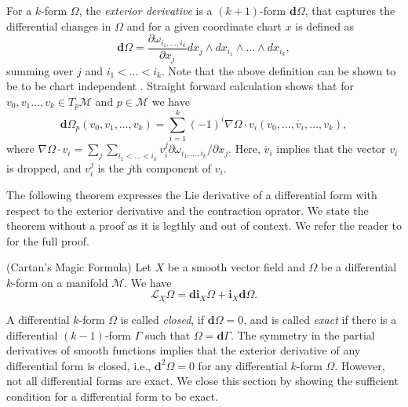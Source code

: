 For a $k$-form $\Omega$, the \emph{exterior derivative} is a $(k+1)$-form $\mathbf d \Omega$, that captures the differential changes in $\Omega$ and for a given coordinate chart $x$ is defined as
\begin{equation} \label{eq:2.13}
	\mathbf d \Omega = \frac{\partial \omega_{i_1,\dots,i_k}}{\partial x_j} dx_j\wedge dx_{i_1}\wedge\dots\wedge dx_{i_k},
\end{equation}
summing over $j$ and $i_1<\dots<i_k$. Note that the above definition can be shown to be to be chart independent \cite{rudin1964principles}. Straight forward calculation shows \cite{abraham1978foundations} that for $v_0,v_1\dots,v_k \in T_p\mathcal M$ and $p\in \mathcal M$ we have
\begin{equation} \label{eq:2.14}
	\mathbf d \Omega_p(v_0,v_1,\dots,v_k) = \sum_{i=1}^k (-1)^i \nabla \Omega \cdot v_i (v_0,\dots,\mathring{v_i},\dots,v_k), 
\end{equation}
where $\nabla \Omega \cdot v_i = \sum_j \sum_{i_1<\dots<i_k} v_i^j \partial \omega_{i_1,\dots,i_k}/\partial x_j$. Here, $\mathring{v_i}$ implies that the vector $v_i$ is dropped, and $v_i^j$ is the $j$th component of $v_i$. 

The following theorem expresses the Lie derivative of a differential form with respect to the exterior derivative and the contraction oprator. We state the theorem without a proof as it is legthly and out of context. We refer the reader to \cite{abraham1978foundations} for the full proof.

\begin{theorem} \label{extra:2}\cite{abraham1978foundations}
(Cartan's Magic Formula) Let $X$ be a smooth vector field and $\Omega$ be a differential $k$-form on a manifold $\mathcal M$. We have
\begin{equation}
	\mathcal L_X \Omega = \mathbf d \mathbf i_X \Omega + \mathbf i_X \mathbf d \Omega.
\end{equation}
\end{theorem}

A differential $k$-form $\Omega$ is called \emph{closed}, if $\mathbf d \Omega = 0$, and is called \emph{exact} if there is a differential $(k-1)$-form $\Gamma$ such that $\Omega = \mathbf d \Gamma$. The symmetry in the partial derivatives of smooth functions implies that the exterior derivative of any differential form is closed, i.e., $\mathbf d^2 \Omega = 0$ for any differential $k$-form $\Omega$. However, not all differential forms are exact. We close this section by showing the sufficient condition for a differential form to be exact.


